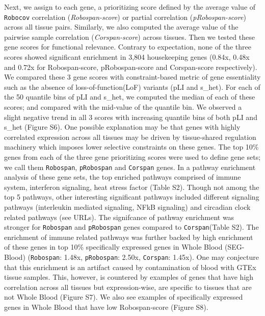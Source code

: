 \documentclass{bioinfo}
\def\Robocov{\texttt{Robocov}}
\def\Robospan{\texttt{Robospan}}
\def\pRobospan{\texttt{pRobospan}}
\def\Corspan{\texttt{Corspan}}
\begin{document}


Next, we assign to each gene, a prioritizing score defined by the average value of \Robocov{} correlation (\textit{Robospan-score}) or partial correlation (\textit{pRobospan-score}) across all tissue pairs. Similarly, we also computed the average value of the pairwise sample correlation (\textit{Corspan-score}) across tissues. Then we tested these gene scores for functional relevance. Contrary to expectation, none of the three scores showed significant enrichment in 3,804 housekeeping genes\cite{eisenberg2013} (0.84x, 0.48x and 0.72x for Robospan-score,  pRobospan-score and Corspan-score  respectively). We compared these 3 gene scores with constraint-based metric of gene essentiality such as the absence of loss-of-function(LoF) variants (pLI\cite{Lek2016} and s\_het\cite{cassa2017}). For each of the 50 quantile bins of pLI and s\_het, we computed the median of each of these scores; and compared with the mid-value of the quantile bin. We observed a slight negative trend in all 3 scores with increasing quantile bins of both pLI and  s\_het  (Figure S6). One possible explanation may be that genes with highly correlated expression across all tissues may be driven by tissue-shared regulation machinery which imposes lower selective constraints on these genes. 
The top 10$\%$ genes from each of the three gene prioritizing scores were used to define gene sets; we call them \Robospan{}, \pRobospan{} and \Corspan{} genes. In a pathway  enrichment analysis\cite{Kamburov2012} of these gene sets, the top enriched pathways comprised of immune system, interferon signaling, heat stress factor (Table S2). Though not among the top 5 pathways, other interesting significant pathways included different signaling pathways (interleukin mediated signaling, NFkB signaling) and circadian clock related pathways (see URLs). The signifcance of pathway enrichment was stronger for \Robospan{} and \pRobospan{} genes compared to \Corspan{}(Table S2). The enrichment of immune related pathways was further backed by high enrichment of these genes in top 10$\%$ specifically expressed genes in Whole Blood (SEG-Blood\cite{Finucane2018}) (\Robospan{}: 1.48x, \pRobospan{}: 2.50x, \Corspan{}: 1.45x). One may conjecture that this enrichment is an artifact caused by contamination of blood with GTEx tissue samples. This, however, is countered by examples of genes that have high correlation across all tissues but expression-wise, are specific to tissues that are not Whole Blood (Figure S7). We also see examples of specifically expressed genes in Whole Blood that have low Robospan-score (Figure S8).
\end{document}

